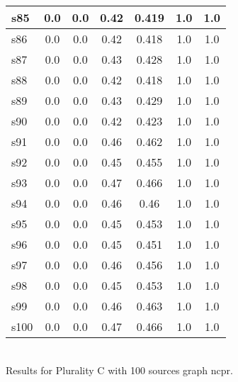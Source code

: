 \documentclass{article}
\begin{document}
\begin{tabular}{|l|c|c|c|c|c|c|}
\hline
s85 &0.0 & 0.0 & 0.42 & 0.419 & 1.0 & 1.0\\
\hline
s86 &0.0 & 0.0 & 0.42 & 0.418 & 1.0 & 1.0\\
\hline
s87 &0.0 & 0.0 & 0.43 & 0.428 & 1.0 & 1.0\\
\hline
s88 &0.0 & 0.0 & 0.42 & 0.418 & 1.0 & 1.0\\
\hline
s89 &0.0 & 0.0 & 0.43 & 0.429 & 1.0 & 1.0\\
\hline
s90 &0.0 & 0.0 & 0.42 & 0.423 & 1.0 & 1.0\\
\hline
s91 &0.0 & 0.0 & 0.46 & 0.462 & 1.0 & 1.0\\
\hline
s92 &0.0 & 0.0 & 0.45 & 0.455 & 1.0 & 1.0\\
\hline
s93 &0.0 & 0.0 & 0.47 & 0.466 & 1.0 & 1.0\\
\hline
s94 &0.0 & 0.0 & 0.46 & 0.46 & 1.0 & 1.0\\
\hline
s95 &0.0 & 0.0 & 0.45 & 0.453 & 1.0 & 1.0\\
\hline
s96 &0.0 & 0.0 & 0.45 & 0.451 & 1.0 & 1.0\\
\hline
s97 &0.0 & 0.0 & 0.46 & 0.456 & 1.0 & 1.0\\
\hline
s98 &0.0 & 0.0 & 0.45 & 0.453 & 1.0 & 1.0\\
\hline
s99 &0.0 & 0.0 & 0.46 & 0.463 & 1.0 & 1.0\\
\hline
s100 &0.0 & 0.0 & 0.47 & 0.466 & 1.0 & 1.0\\
\hline
\end{tabular}\\

\noindent Results for Plurality C with 100 sources graph ncpr.
\end{document}
